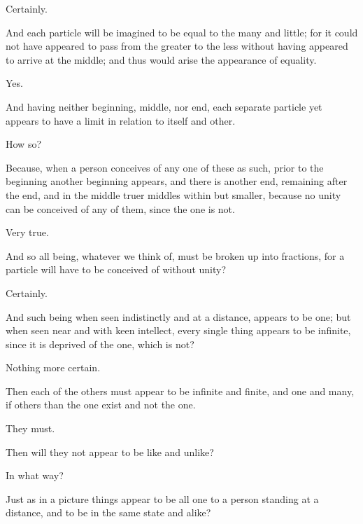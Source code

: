 \documentclass[11pt,letter]{article}
\begin{document}
\par  Certainly.

\par  And each particle will be imagined to be equal to the many and little; for it could not have appeared to pass from the greater to the less without having appeared to arrive at the middle; and thus would arise the appearance of equality.

\par  Yes.

\par  And having neither beginning, middle, nor end, each separate particle yet appears to have a limit in relation to itself and other.

\par  How so?

\par  Because, when a person conceives of any one of these as such, prior to the beginning another beginning appears, and there is another end, remaining after the end, and in the middle truer middles within but smaller, because no unity can be conceived of any of them, since the one is not.

\par  Very true.

\par  And so all being, whatever we think of, must be broken up into fractions, for a particle will have to be conceived of without unity?

\par  Certainly.

\par  And such being when seen indistinctly and at a distance, appears to be one; but when seen near and with keen intellect, every single thing appears to be infinite, since it is deprived of the one, which is not?

\par  Nothing more certain.

\par  Then each of the others must appear to be infinite and finite, and one and many, if others than the one exist and not the one.

\par  They must.

\par  Then will they not appear to be like and unlike?

\par  In what way?

\par  Just as in a picture things appear to be all one to a person standing at a distance, and to be in the same state and alike?
\end{document}
